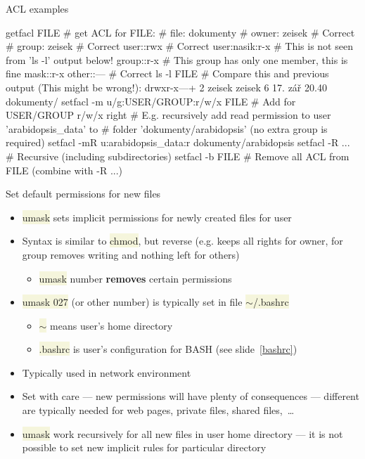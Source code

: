\documentclass[compress, xelatex, 11pt, xcolor=svgnames, aspectratio=169,
	hyperref={
		bookmarks=true,
		unicode=true,
		colorlinks=true,
		pdftitle={Linux, command line and MetaCentrum},
		plainpages=false,
		pdfauthor={Vojtech Zeisek},
		pdfsubject={Course about use of Linux command line, writing shell scripts and using MetaCentrum of CESNET},
		pdfcreator={XeLaTeX},
		pdfkeywords={Linux, GNU, BASH, shell, command line, MetaCentrum},
		linkcolor=DarkRed, %
		anchorcolor=DarkBlue, %
		citecolor=Indigo, %
		filecolor=NavyBlue, %
		menucolor=DarkMagenta, %
		urlcolor=DarkBlue, %
		},
	url={hyphens, lowtilde} %
	]{beamer}
\renewcommand{\texttt}[1]{\colorbox{Beige}{{\ttfamily #1}}}
\begin{document}
\begin{frame}[fragile]{ACL examples}
	\begin{bashcode}
    getfacl FILE # get ACL for FILE:
    # file: dokumenty
    # owner: zeisek # Correct
    # group: zeisek # Correct
    user::rwx       # Correct
    user:nasik:r-x  # This is not seen from 'ls -l' output below!
    group::r-x      # This group has only one member, this is fine
    mask::r-x
    other::---      # Correct
    ls -l FILE # Compare this and previous output (This might be wrong!):
    drwxr-x---+  2 zeisek zeisek     6 17. zář 20.40 dokumenty/
    setfacl -m u/g:USER/GROUP:r/w/x FILE # Add for USER/GROUP r/w/x right
    # E.g. recursively add read permission to user 'arabidopsis_data' to
    # folder 'dokumenty/arabidopsis' (no extra group is required)
    setfacl -mR u:arabidopsis_data:r dokumenty/arabidopsis
    setfacl -R ... # Recursive (including subdirectories)
    setfacl -b FILE # Remove all ACL from FILE (combine with -R ...)
	\end{bashcode}
\end{frame}

\begin{frame}{Set default permissions for new files}
	\begin{itemize}
		\item \texttt{umask} sets implicit permissions for newly created files for user
		\item Syntax is similar to \texttt{chmod}, but reverse (e.g. \texttt{027} keeps all rights for owner, for group removes writing and nothing left for others)
		\begin{itemize}
			\item \texttt{umask} number \textbf{removes} certain permissions
		\end{itemize}
		\item \texttt{umask 027} (or other number) is typically set in file \texttt{$\sim$/.bashrc}
		\begin{itemize}
			\item \texttt{$\sim$} means user's home directory
			\item \texttt{.bashrc} is user's configuration for BASH (see slide~\ref{bashrc})
		\end{itemize}
		\item Typically used in network environment
		\item Set with care --- new permissions will have plenty of consequences --- different are typically needed for web pages, private files, shared files,~\ldots
		\item \texttt{umask} work recursively for all new files in user home directory --- it is not possible to set new implicit rules for particular directory
	\end{itemize}
\end{frame}
\end{document}
